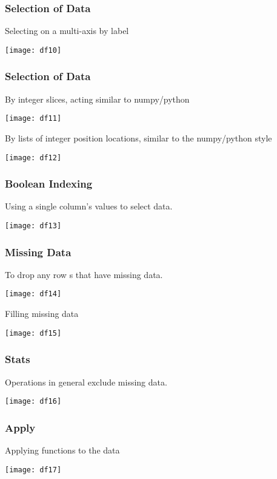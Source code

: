\begin{frame}[fragile]\frametitle{Selection of  Data}
Selecting on a multi-axis by label
\begin{center}
\texttt{[image: df10]}
\end{center}
\end{frame}

\begin{frame}[fragile]\frametitle{Selection of  Data}
By integer slices, acting similar to numpy/python
\begin{center}
\texttt{[image: df11]}
\end{center}
By lists of integer position locations, similar to the numpy/python style
\begin{center}
\texttt{[image: df12]}
\end{center}
\end{frame}

\begin{frame}[fragile]\frametitle{ Boolean Indexing}
Using a single column's values to select data.
\begin{center}
\texttt{[image: df13]}
\end{center}
\end{frame}

\begin{frame}[fragile]\frametitle{ Missing Data}
To drop any row s that have missing data.
\begin{center}
\texttt{[image: df14]}
\end{center}
Filling missing data
\begin{center}
\texttt{[image: df15]}
\end{center}
\end{frame}

\begin{frame}[fragile]\frametitle{ Stats}
Operations in general exclude missing data.
\begin{center}
\texttt{[image: df16]}
\end{center}
\end{frame}

\begin{frame}[fragile]\frametitle{ Apply}
Applying functions to the data
\begin{center}
\texttt{[image: df17]}
\end{center}
\end{frame}